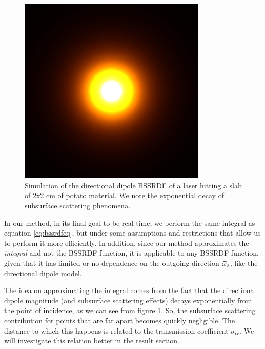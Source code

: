 \begin{figure}[!ht]
\centering
\includegraphics[width=0.8\textwidth]{images/bssrdf_slab_potato.png}
\caption{Simulation of the directional dipole BSSRDF of a laser hitting a slab of 2x2 cm of potato material. We note the exponential decay of subsurface scattering phenomena.}
\label{fig:slab_potato}
\end{figure}

In our method, in its final goal to be real time, we perform the same integral as equation \ref{eq:bssrdfeq}, but under some assumptions and restrictions that allow us to perform it more efficiently. In addition, since our method approximates the \emph{integral} and not the BSSRDF function, it is applicable to any BSSRDF function, given that it has limited or no dependence on the outgoing direction $\vec{\omega}_o$, like the directional dipole model.

The idea on approximating the integral comes from the fact that the directional dipole magnitude (and subsurface scattering effects) decays exponentially from the point of incidence, as we can see from figure \ref{fig:slab_potato}. So, the subsurface scattering contribution for points that are far apart becomes quickly negligible. The distance to which this happens is related to the transmission coefficient $\sigma_{tr}$. We will investigate this relation better in the result section. 

